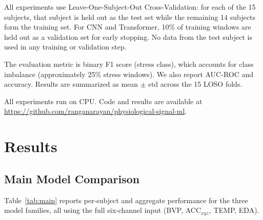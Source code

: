 \documentclass[10pt,twocolumn]{article}
\begin{document}
All experiments use Leave-One-Subject-Out Cross-Validation: for each of
the 15 subjects, that subject is held out as the test set while the
remaining 14 subjects form the training set. For CNN and Transformer,
10\% of training windows are held out as a validation set for early stopping.
No data from the test subject is used in any training or validation step.

The evaluation metric is binary F1 score (stress class), which accounts for
class imbalance (approximately 25\% stress windows). We also report
AUC-ROC and accuracy. Results are summarized as mean $\pm$ std across
the 15 LOSO folds.

All experiments run on CPU. Code and results are available at
\url{https://github.com/ranganarayan/physiological-signal-ml}.

\section{Results}
\label{sec:results}

\subsection{Main Model Comparison}

Table~\ref{tab:main} reports per-subject and aggregate performance for
the three model families, all using the full six-channel input
(BVP, ACC$_{xyz}$, TEMP, EDA).
\end{document}
